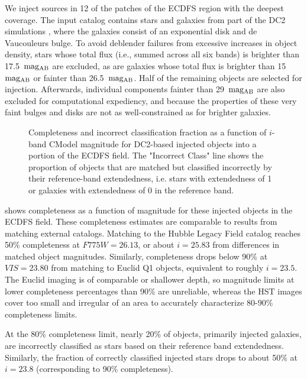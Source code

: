 We inject sources in 12 of the patches of the \gls{ECDFS} region with the deepest coverage.
The input catalog contains stars and galaxies from part of the \gls{DC2} simulations \citep{2021ApJS..253...31L}, where the galaxies consist of an exponential disk and de Vaucouleurs \citep{1948AnAp...11..247D,1953MNRAS.113..134D} bulge.
To avoid deblender failures from excessive increases in object density, stars whose total \gls{flux} (i.e., summed across all six bands) is brighter than 17.5~${\rm mag_{\rm AB}}$ are excluded, as are galaxies whose total \gls{flux} is brighter than 15~${\rm mag_{AB}}$ or fainter than 26.5~${\rm mag_{AB}}$.
Half of the remaining objects are selected for injection.
Afterwards, individual components fainter than 29~${\rm mag_{AB}}$ are also excluded for computational expediency, and because the properties of these very faint bulges and disks are not as well-constrained as for brighter galaxies.
\begin{figure}[htb]
\caption{Completeness and incorrect classification fraction as a function of $i$-band CModel magnitude for DC2-based injected objects into a portion of the ECDFS field. 
The "Incorrect Class" line shows the proportion of objects that are matched but classified incorrectly by their reference-band extendedness, i.e. stars with extendedness of 1 or galaxies with extendedness of 0 in the reference band.}
\label{fig:injected_lsst_cells_v1_5063_i_completeness_any}
\end{figure}

 shows completeness as a function of magnitude for these injected objects in the \gls{ECDFS} field.
These completeness estimates are comparable to results from matching external catalogs. 
Matching to the Hubble Legacy Field catalog \citep{2016arXiv160600841I, 2019ApJS..244...16W} reaches 50\% completeness at $F775W=26.13$, or about $i=25.83$ from differences in matched object magnitudes.
Similarly, completeness drops below 90\% at $VIS=23.80$ from matching to Euclid Q1 \citep{2025arXiv250315305E} objects, equivalent to roughly $i=23.5$. 
The Euclid imaging is of comparable or shallower depth, so magnitude limits at lower completeness percentages than 90\% are unreliable, whereas the HST images cover too small and irregular of an area to accurately characterize 80-90\% completeness limits.

At the 80\% completeness limit, nearly 20\% of objects, primarily injected galaxies, are incorrectly classified as stars based on their reference band extendedness.
Similarly, the fraction of correctly classified injected stars drops to about 50\% at $i=23.8$ (corresponding to 90\% completeness).

